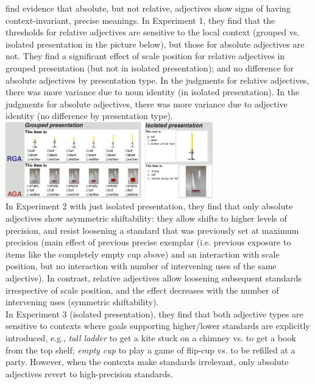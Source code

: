 \documentclass[fleqn,reqno,10pt]{article}
\begin{document}
\citet{KimXiangKennedy:2014} find evidence that absolute, but not relative, adjectives show signs of having context-invariant, precise meanings. In Experiment 1, they find that the thresholds for relative adjectives are sensitive to the local context (grouped vs. isolated presentation in the picture below), but those for absolute adjectives are not. They find a significant effect of scale position for relative adjectives in grouped presentation (but not in isolated presentation); and no difference for absolute adjectives by presentation type. In the judgments for relative adjectives, there was more variance due to noun identity (in isolated presentation). In the judgments for absolute adjectives, there was more variance due to adjective identity (no difference by presentation type).\\
\includegraphics[width=9cm]{images/kim-xiang-kennedy-groups-isolated.png}\\
In Experiment 2 with just isolated presentation, they find that only absolute adjectives show asymmetric shiftability: they allow shifts to higher levels of precision, and resist loosening a standard that was previously set at maximum precision (main effect of previous precise exemplar (i.e. previous exposure to items like the completely empty cup above) and an interaction with scale position, but no interaction with number of intervening uses of the same adjective). In contrast, relative adjectives allow loosening subsequent standards irrespective of scale position, and the effect decreases with the number of intervening uses (symmetric shiftability).\\
In Experiment 3 (isolated presentation), they find that both adjective types are sensitive to contexts where goals supporting higher/lower standards are explicitly introduced, e.g., \textit{tall ladder} to get a kite stuck on a chimney vs. to get a book from the top shelf; \textit{empty cup} to play a game of flip-cup vs. to be refilled at a party. However, when the contexts make standards irrelevant, only absolute adjectives revert to high-precision standards.\\
\end{document}
